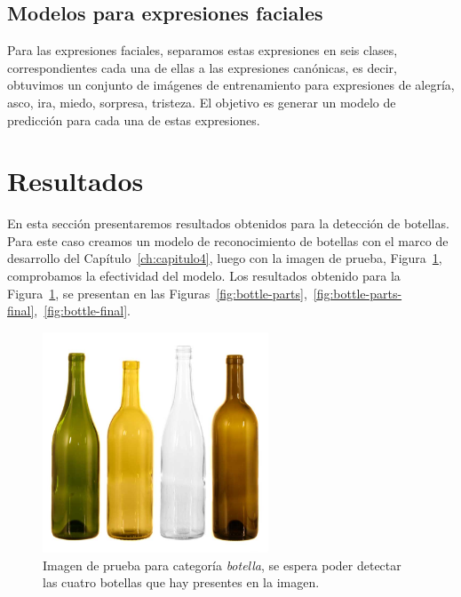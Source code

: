 \subsection{Modelos para expresiones faciales}\label{subsec:m_face}
Para las expresiones faciales, separamos estas expresiones en seis clases, correspondientes cada una de ellas a las expresiones canónicas, es decir, obtuvimos un conjunto de imágenes de entrenamiento para expresiones de alegría, asco, ira, miedo, sorpresa, tristeza. El objetivo es generar un modelo de predicción para cada una de estas expresiones.

\section{Resultados}
En esta sección presentaremos resultados obtenidos para la detección de botellas. Para este caso creamos un modelo de reconocimiento de botellas con el marco de desarrollo del Capítulo~\ref{ch:capitulo4}, luego con la imagen de prueba, Figura~\ref{fig:bottle}, comprobamos la efectividad del modelo. Los resultados obtenido para la Figura~\ref{fig:bottle}, se presentan en las Figuras~\ref{fig:bottle-parts},~\ref{fig:bottle-parts-final},~\ref{fig:bottle-final}.
\begin{figure}[tb]
\centering
 \includegraphics[width=0.6\textwidth]{Figuras/results/bottle.jpg}
 \caption[Imagen de botellas]{Imagen de prueba para categoría \textit{botella}, se espera poder detectar las cuatro botellas que hay presentes en la imagen.}
 \label{fig:bottle}
\end{figure}

